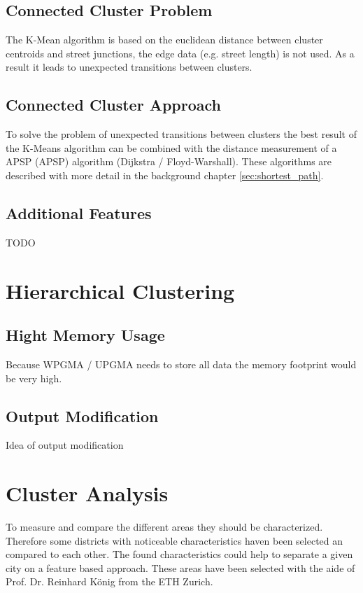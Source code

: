 \subsection{Connected Cluster Problem} \label{sec:kmenasProblem}
The K-Mean algorithm is based on the euclidean distance between cluster centroids and street junctions, the edge data (e.g. street length) is not used. As a result it leads to unexpected transitions between clusters.

\subsection{Connected Cluster Approach} \label{sec:connected_cluster_approach}
To solve the problem of unexpected transitions between clusters the best result of the K-Means algorithm can be combined with the distance measurement of a \acrlong{APSP} (\acrshort{APSP}) algorithm (Dijkstra / Floyd-Warshall). These algorithms are described with more detail in the background chapter \ref{sec:shortest_path}.

\subsection{Additional Features}
TODO

\pagebreak
\section{Hierarchical Clustering}

\subsection{Hight Memory Usage}
Because WPGMA / UPGMA needs to store all data the memory footprint would be very high. %

\subsection{Output Modification}
Idea of output modification

\pagebreak
\section{Cluster Analysis}
\label{sec:concept_cluster_analysis}
To measure and compare the different areas they should be characterized. Therefore some districts with noticeable characteristics haven been selected an compared to each other. The found characteristics could help to separate a given city on a feature based approach.
These areas have been selected with the aide of Prof. Dr. Reinhard König from the ETH Zurich.


